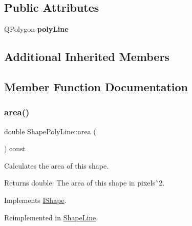 \subsection*{Public Attributes}
\begin{DoxyCompactItemize}
\item 
\mbox{\label{class_shape_poly_line_ab73d17354e6862c275b8ab495cd8e995}} 
Q\+Polygon {\bfseries poly\+Line}
\end{DoxyCompactItemize}
\subsection*{Additional Inherited Members}


\subsection{Member Function Documentation}
\mbox{\label{class_shape_poly_line_ace9d3c1eefec00364034dc420262c91e}} 
\subsubsection{\texorpdfstring{area()}{area()}}
{\footnotesize\ttfamily double Shape\+Poly\+Line\+::area (\begin{DoxyParamCaption}{ }\end{DoxyParamCaption}) const\hspace{0.3cm}{\ttfamily [virtual]}}



Calculates the area of this shape. 

\begin{DoxyReturn}{Returns}
double\+: The area of this shape in pixels$^\wedge$2. 
\end{DoxyReturn}


Implements \mbox{\hyperlink{class_i_shape_aed742a160acdd13c9cfdeb16e605afea}{I\+Shape}}.



Reimplemented in \mbox{\hyperlink{class_shape_line_a6f33bdd78706ad73e570b4ba53bbc00b}{Shape\+Line}}.

\mbox{\label{class_shape_poly_line_a6aaca4bd2767644f9ea0f68065fa1f98}} 
